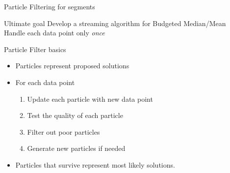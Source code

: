 \documentclass[compress]{beamer}
\begin{document}
\begin{frame}{Particle Filtering for segments}
\begin{block}{Ultimate goal}
Develop a streaming algorithm for Budgeted Median/Mean\\
Handle each data point only \textit{once}
\end{block}

\pause

\begin{block}{Particle Filter basics}
\begin{itemize}
    \item Particles represent proposed solutions \\
    \item For each data point
    \begin{enumerate}
        \item Update each particle with new data point
        \item Test the quality of each particle
        \item Filter out poor particles
        \item Generate new particles if needed
    \end{enumerate}
    \item Particles that survive represent most likely solutions.
\end{itemize}
\end{block}

\end{frame}
\end{document}
